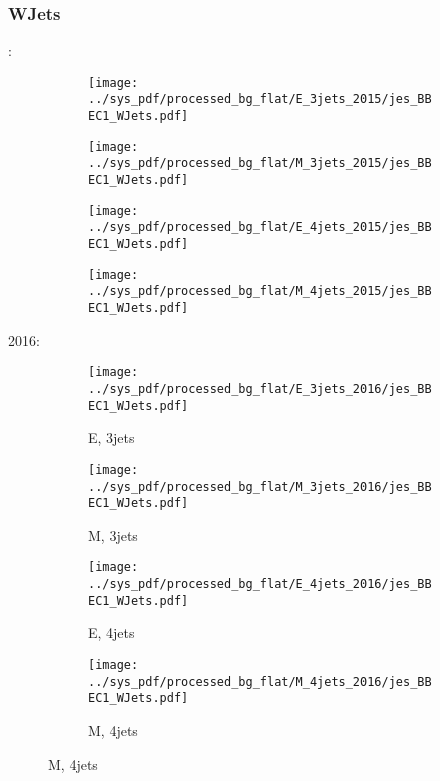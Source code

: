 \documentclass{beamer}
\begin{document}
\begin{frame}
\frametitle{WJets}
\fontsize{5}{1}:
\begin{figure}
\centering
\begin{subfigure}[b]{0.24\textwidth}
\texttt{[image: ../sys\_pdf/processed\_bg\_flat/E\_3jets\_2015/jes\_BBEC1\_WJets.pdf]}
\end{subfigure}
\begin{subfigure}[b]{0.24\textwidth}
\texttt{[image: ../sys\_pdf/processed\_bg\_flat/M\_3jets\_2015/jes\_BBEC1\_WJets.pdf]}
\end{subfigure}
\begin{subfigure}[b]{0.24\textwidth}
\texttt{[image: ../sys\_pdf/processed\_bg\_flat/E\_4jets\_2015/jes\_BBEC1\_WJets.pdf]}
\end{subfigure}
\begin{subfigure}[b]{0.24\textwidth}
\texttt{[image: ../sys\_pdf/processed\_bg\_flat/M\_4jets\_2015/jes\_BBEC1\_WJets.pdf]}
\end{subfigure}
\end{figure}
2016:
\begin{figure}
\centering
\begin{subfigure}[b]{0.24\textwidth}
\texttt{[image: ../sys\_pdf/processed\_bg\_flat/E\_3jets\_2016/jes\_BBEC1\_WJets.pdf]}
\captionsetup{font=tiny}
\caption{E, 3jets}
\end{subfigure}
\begin{subfigure}[b]{0.24\textwidth}
\texttt{[image: ../sys\_pdf/processed\_bg\_flat/M\_3jets\_2016/jes\_BBEC1\_WJets.pdf]}
\captionsetup{font=tiny}
\caption{M, 3jets}
\end{subfigure}
\begin{subfigure}[b]{0.24\textwidth}
\texttt{[image: ../sys\_pdf/processed\_bg\_flat/E\_4jets\_2016/jes\_BBEC1\_WJets.pdf]}
\captionsetup{font=tiny}
\caption{E, 4jets}
\end{subfigure}
\begin{subfigure}[b]{0.24\textwidth}
\texttt{[image: ../sys\_pdf/processed\_bg\_flat/M\_4jets\_2016/jes\_BBEC1\_WJets.pdf]}
\captionsetup{font=tiny}
\caption{M, 4jets}
\end{subfigure}
\end{figure}
\end{frame}
\end{document}
